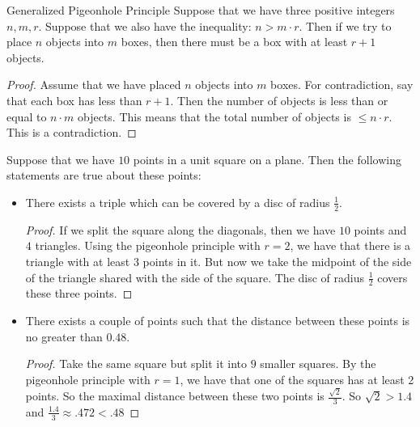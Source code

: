 \documentclass{report}
\begin{document}
\begin{theorem}{Generalized Pigeonhole Principle}
    Suppose that we have three positive integers $n, m, r$. Suppose that we also have the inequality: $n > m \cdot r$. Then if we try to place $n$ objects into $m$ boxes, then there must be a box with at least $r + 1$ objects.
\end{theorem} 

\begin{proof}
    Assume that we have placed $n$ objects into $m$ boxes. For contradiction, say that each box has less than $r + 1$. Then the number of objects is less than or equal to $n \cdot m$ objects. This means that the total number of objects is $\leq n \cdot r$. This is a contradiction.
\end{proof}

\begin{examples}
    \begin{example}
        Suppose that we have $10$ points in a unit square on a plane. Then the following statements are true about these points:
            \begin{itemize}
                \item There exists a triple which can be covered by a disc of radius $\frac{1}{2}$.
                    \begin{proof}
                        If we split the square along the diagonals, then we have $10$ points and $4$ triangles. Using the pigeonhole principle with $r = 2$, we have that there is a triangle with at least $3$ points in it. But now we take the midpoint of the side of the triangle shared with the side of the square. The disc of radius $\frac{1}{2}$ covers these three points.
                    \end{proof}

                \item There exists a couple of points such that the distance between these points is no greater than $0.48$.
                    \begin{proof}
                        Take the same square but split it into $9$ smaller squares. By the pigeonhole principle with $r = 1$, we have that one of the squares has at least 2 points. So the maximal distance between these two points is $\frac{\sqrt{2}}{3}$. So $\sqrt{2} > 1.4$ and $\frac{1.4}{3} \approx .472 <  .48$
                    \end{proof}
            \end{itemize}
    \end{example}
\end{examples}
\end{document}
